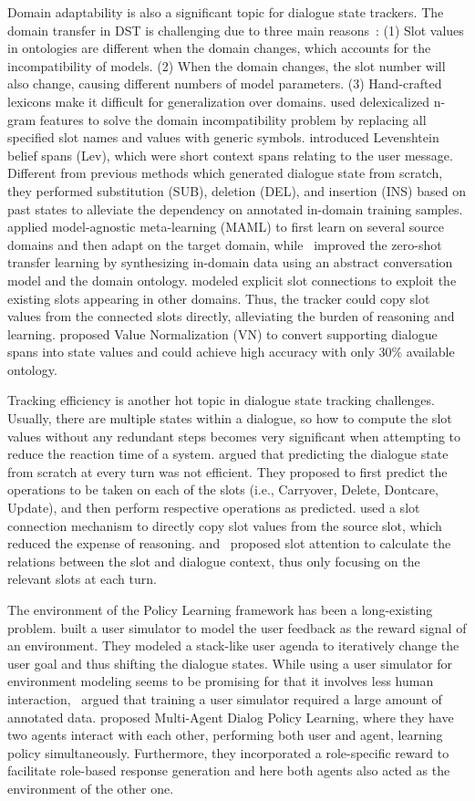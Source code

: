 Domain adaptability is also a significant topic for dialogue state trackers. The domain transfer in DST is challenging due to three main reasons~: (1) Slot values in ontologies are different when the domain changes, which accounts for the incompatibility of models. (2) When the domain changes, the slot number will also change, causing different numbers of model parameters. (3) Hand-crafted lexicons make it difficult for generalization over domains.  used delexicalized n-gram features to solve the domain incompatibility problem by replacing all specified slot names and values with generic symbols.  introduced Levenshtein belief spans (Lev), which were short context spans relating to the user message. Different from previous methods which generated dialogue state from scratch, they performed substitution (SUB), deletion (DEL), and insertion (INS) based on past states to alleviate the dependency on annotated in-domain training samples.  applied model-agnostic meta-learning (MAML) to first learn on several source domains and then adapt on the target domain, while~ improved the zero-shot transfer learning by synthesizing in-domain data using an abstract conversation model and the domain ontology.  modeled explicit slot connections to exploit the existing slots appearing in other domains. Thus, the tracker could copy slot values from the connected slots directly, alleviating the burden of reasoning and learning.  proposed Value Normalization (VN) to convert supporting dialogue spans into state values and could achieve high accuracy with only 30\% available ontology.

Tracking efficiency is another hot topic in dialogue state tracking challenges. Usually, there are multiple states within a dialogue, so how to compute the slot values without any redundant steps becomes very significant when attempting to reduce the reaction time of a system.  argued that predicting the dialogue state from scratch at every turn was not efficient. They proposed to first predict the operations to be taken on each of the slots (i.e., Carryover, Delete, Dontcare, Update), and then perform respective operations as predicted.  used a slot connection mechanism to directly copy slot values from the source slot, which reduced the expense of reasoning.  and~ proposed slot attention to calculate the relations between the slot and dialogue context, thus only focusing on the relevant slots at each turn.

The environment of the Policy Learning framework has been a long-existing problem.  built a user simulator to model the user feedback as the reward signal of an environment. They modeled a stack-like user agenda to iteratively change the user goal and thus shifting the dialogue states. While using a user simulator for environment modeling seems to be promising for that it involves less human interaction,~ argued that training a user simulator required a large amount of annotated data.  proposed Multi-Agent Dialog Policy Learning, where they have two agents interact with each other, performing both user and agent, learning policy simultaneously. Furthermore, they incorporated a role-specific reward to facilitate role-based response generation and here both agents also acted as the environment of the other one.

